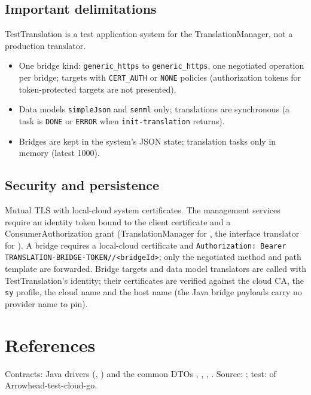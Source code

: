 \documentclass[a4paper]{arrowhead}
\begin{document}
\subsection{Important delimitations}
TestTranslation is a test application system for the TranslationManager, not a production translator.
\begin{itemize}
\item One bridge kind: \texttt{generic\_https} to \texttt{generic\_https}, one negotiated operation per bridge; targets with \texttt{CERT\_AUTH} or \texttt{NONE} policies (authorization tokens for token-protected targets are not presented).
\item Data models \texttt{simpleJson} and \texttt{senml} only; translations are synchronous (a task is \texttt{DONE} or \texttt{ERROR} when \texttt{init-translation} returns).
\item Bridges are kept in the system's JSON state; translation tasks only in memory (latest 1000).
\end{itemize}
\subsection{Security and persistence}
Mutual TLS with local-cloud system certificates. The management services require an identity token bound to the client certificate and a ConsumerAuthorization grant (TranslationManager for , the interface translator for ). A bridge requires a local-cloud certificate and \texttt{Authorization: Bearer TRANSLATION-BRIDGE-TOKEN//<bridgeId>}; only the negotiated method and path template are forwarded. Bridge targets and data model translators are called with TestTranslation's identity; their certificates are verified against the cloud CA, the \texttt{sy} profile, the cloud name and the host name (the Java bridge payloads carry no provider name to pin).
\section{References}
Contracts: Java  drivers (, ) and the common DTOs , , , . Source: ; test:  of Arrowhead-test-cloud-go.
\end{document}
